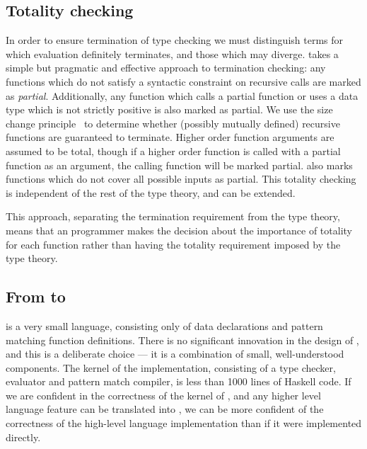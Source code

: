 
\subsection{Totality checking}

In order to ensure termination of type checking we must distinguish terms for
which evaluation definitely terminates, and those which may diverge. \TT{}
takes a simple but pragmatic and effective approach to termination checking:
any functions which do not satisfy a syntactic constraint on recursive calls
are marked as \emph{partial}. Additionally, any function which calls a partial
function or uses a data type which is not strictly positive is also marked as
partial. We use the size change principle~\cite{Lee2001} to determine whether
(possibly mutually defined) recursive functions are guaranteed to
terminate.  Higher order function arguments are assumed to be total, though
if a higher order function is called with a partial function as an argument,
the calling function will be marked partial.
\TT{} also marks functions which do not cover
all possible inputs as partial. This totality checking is independent of the
rest of the type theory, and can be extended.

This approach, separating the termination requirement from the type theory,
means that an \Idris{} programmer makes the decision about the importance of
totality for each function rather than having the totality requirement imposed
by the type theory.

\subsection{From \Idris{} to \TT{}}

\TT{} is a very small language, consisting only of data declarations and pattern matching
function definitions. There is no significant innovation in the design of \TT{}, and this
is a deliberate choice --- it is a combination of small, well-understood components.
The kernel of the \TT{} implementation, consisting of a type checker, evaluator and
pattern match compiler, is less than 1000 lines of Haskell code. If we are confident
in the correctness of the kernel of \TT{}, and any higher level language feature
can be translated into \TT{}, we can be more confident of the correctness of
the high-level language implementation than if it were implemented directly.

